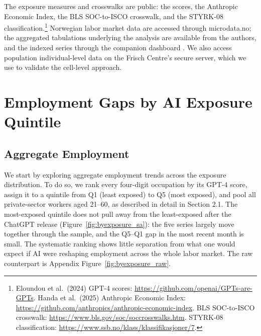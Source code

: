 \documentclass[12pt]{article}
\begin{document}
The exposure measures and crosswalks are public: the \citet{eloundou2024} scores, the \citet{handa2025} Anthropic Economic Index, the BLS SOC-to-ISCO crosswalk, and the STYRK-08 classification.\footnote{Eloundou et al.\ (2024) GPT-4 scores: \url{https://github.com/openai/GPTs-are-GPTs}. Handa et al.\ (2025) Anthropic Economic Index: \url{https://github.com/anthropics/anthropic-economic-index}. BLS SOC-to-ISCO crosswalk: \url{https://www.bls.gov/soc/soccrosswalks.htm}. STYRK-08 classification: \url{https://www.ssb.no/klass/klassifikasjoner/7}.} Norwegian labor market data are accessed through microdata.no; the aggregated tabulations underlying the analysis are available from the authors, and the indexed series through the companion dashboard \citep{kiindeksen2026}. We also access population individual-level data on the Frisch Centre's secure server, which we use to validate the cell-level approach.




\section{Employment Gaps by AI Exposure Quintile}\label{sec:results}

\subsection{Aggregate Employment}\label{sec:results:quintiles}

We start by exploring aggregate employment trends across the exposure distribution. To do so, we rank every four-digit occupation by its \citet{eloundou2024} GPT-4 score, assign it to a quintile from Q1 (least exposed) to Q5 (most exposed), and pool all private-sector workers aged 21--60, as described in detail in Section 2.1. The most-exposed quintile does not pull away from the least-exposed after the ChatGPT release (Figure~\ref{fig:byexposure_sa}): the five series largely move together through the sample, and the Q5--Q1 gap in the most recent month is small. The systematic ranking shows little separation from what one would expect if AI were reshaping employment across the whole labor market. The raw counterpart is Appendix Figure~\ref{fig:byexposure_raw}.
\end{document}
